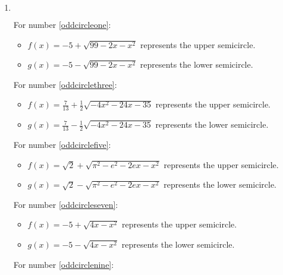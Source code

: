 \begin{enumerate}
\setcounter{enumi}{\value{HW}}

\item $~$


For number \ref{oddcircleone}:

\begin{itemize}

\item  $f(x) = -5 + \sqrt{99-2x-x^2}$ represents the upper semicircle.

\item  $g(x) = -5 - \sqrt{99-2x-x^2}$ represents the lower semicircle.

\end{itemize}

For number \ref{oddcirclethree}:

\begin{itemize}

\item  $f(x) = \frac{7}{13} + \frac{1}{2} \sqrt{-4x^2-24x-35}$ represents the upper semicircle.

\item  $g(x) = \frac{7}{13} - \frac{1}{2} \sqrt{-4x^2-24x-35}$ represents the lower semicircle.

\end{itemize}

For number \ref{oddcirclefive}:

\begin{itemize}

\item  $f(x) = \sqrt{2} + \sqrt{\pi^2-e^2-2ex-x^2}$ represents the upper semicircle.

\item  $g(x) = \sqrt{2} - \sqrt{\pi^2-e^2-2ex-x^2}$  represents the lower semicircle.

\end{itemize}


For number \ref{oddcircleseven}:

\begin{itemize}

\item  $f(x) = -5 + \sqrt{4x-x^2}$ represents the upper semicircle.

\item  $g(x) =  -5 - \sqrt{4x-x^2}$   represents the lower semicircle.

\end{itemize}

For number \ref{oddcirclenine}:


\end{enumerate}
